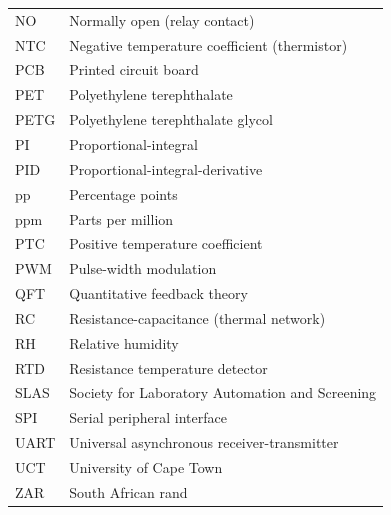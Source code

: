 \begin{longtable}{@{}p{2.4cm} p{}@{}}
NO & Normally open (relay contact) \\
NTC & Negative temperature coefficient (thermistor) \\
PCB & Printed circuit board \\
PET & Polyethylene terephthalate \\
PETG & Polyethylene terephthalate glycol \\
PI & Proportional-integral \\
PID & Proportional-integral-derivative \\
pp & Percentage points \\
ppm & Parts per million \\
PTC & Positive temperature coefficient \\
PWM & Pulse-width modulation \\
QFT & Quantitative feedback theory \\
RC & Resistance-capacitance (thermal network) \\
RH & Relative humidity \\
RTD & Resistance temperature detector \\
SLAS & Society for Laboratory Automation and Screening \\
SPI & Serial peripheral interface \\
UART & Universal asynchronous receiver-transmitter \\
UCT & University of Cape Town \\
ZAR & South African rand \\
\end{longtable}
\normalsize
